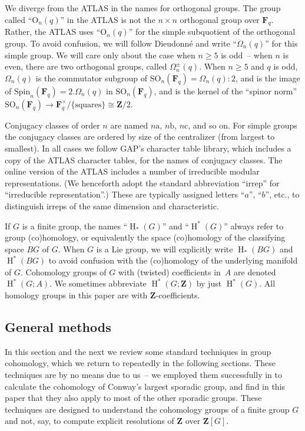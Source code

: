 \documentclass[pdftex]{sigma}
\numberwithin{equation}{section}
\newcommand\bF{\mathbf F}
\newcommand\bZ{\mathbf Z}
\newcommand\ra{\mathrm a}
\newcommand\rb{\mathrm b}
\newcommand\rc{\mathrm c}
\newcommand\rO{\mathrm O}
\DeclareMathOperator\homology{H}
\renewcommand\H{\homology}
\newcommand\<\langle
\renewcommand\>\rangle
\newcommand\Spin{\mathrm{Spin}}
\begin{document}
We diverge from the ATLAS in the names for orthogonal groups.
The group called ``$\rO_n(q)$'' in the ATLAS is not the $n\times n$ orthogonal group over $\bF_q$. Rather, the ATLAS uses ``$\rO_n(q)$'' for the simple subquotient of the orthogonal group. To avoid confusion, we will follow Dieudonn\'e and write ``$\Omega_n(q)$'' for this simple group. We will care only about the case when $n \geq 5$ is odd~-- when $n$ is even, there are two orthogonal groups, called $\Omega^\pm_n(q)$. When $n\geq 5$ and $q$ is odd, $\Omega_n(q)$ is the commutator subgroup of $\mathrm{SO}_n(\bF_q) = \Omega_n(q):2$, and is the image of $\Spin_n(\bF_q) = 2.\Omega_n(q)$ in $\mathrm{SO}_n(\bF_q)$, and is the kernel of the ``spinor norm'' $\mathrm{SO}_n(\bF_q) \to \bF_q^\times / \{\text{squares}\} \cong \bZ/2$.

Conjugacy classes of order $n$ are named $n\ra$, $n\rb$, $n\rc$, and so on. For simple groups the conjugacy classes are ordered by size of the centralizer (from largest to smallest). In all cases we follow GAP's character table library, which includes a copy of the ATLAS character tables, for the names of conjugacy classes. The online version of the ATLAS \cite{ATLASonline} includes a number of irreducible modular representations. (We henceforth adopt the standard abbreviation ``irrep'' for ``irreducible representation''.) These are typically assigned letters ``$a$'', ``$b$'', etc., to distinguish irreps of the same dimension and characteristic.

If $G$ is a finite group, the names ``$\H_*(G)$'' and ``$\H^*(G)$'' always refer to group (co)homology, or equivalently the space (co)homology of the classifying space $BG$ of $G$. When $G$ is a Lie group, we will explicitly write $\H_*(BG)$ and $\H^*(BG)$ to avoid confusion with the (co)homology of the underlying manifold of $G$. Cohomology groups of $G$ with (twisted) coefficients in~$A$ are denoted~$\H^*(G;A)$. We sometimes abbreviate $\H^*(G;\bZ)$ by just $\H^*(G)$. All homology groups in this paper are with $\bZ$-coefficients.

\subsection{General methods}\label{sec:methods}

In this section and the next we review some standard techniques in group cohomology, which we return to repeatedly in the following sections. These techniques are by no means due to us~-- we employed them successfully in \cite{jft} to calculate the cohomology of Conway's largest sporadic group, and find in this paper that they also apply to most of the other sporadic groups. These techniques are designed to understand the cohomology groups of a finite group $G$ and not, say, to compute explicit resolutions of $\bZ$ over $\bZ[G]$.
\end{document}
